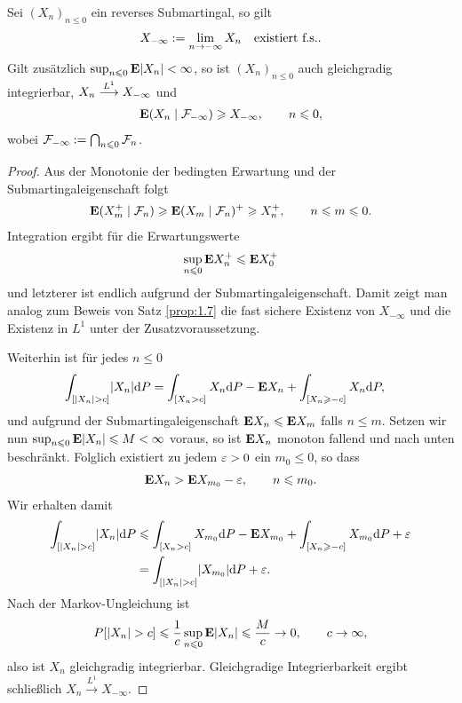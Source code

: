 \begin{prop}
\label{prop:1.8}
Sei $(X_n)_{n\le 0}$ ein reverses Submartingal, so gilt
\begin{align*}
X_{-\infty} := \lim\limits_{n\to-\infty} X_n\quad \text{existiert f.s.}.
\end{align*}
Gilt zusätzlich $\sup_{n\leqslant 0} \mathbf{E} \lvert X_n\rvert < \infty$, so ist $(X_n)_{n\le 0}$
auch gleichgradig integrierbar, $X_n\overset{L^1}{\longrightarrow}X_{-\infty}$ und
\begin{align*}
\mathbf{E}(X_n\mid \mathcal{F}_{-\infty}) \geqslant X_{-\infty},\qquad n\leqslant 0, 
\end{align*}
wobei $\mathcal{F}_{-\infty} := \bigcap_{n\leqslant 0}\mathcal{F}_n$.\fish
\end{prop}
\begin{proof}
Aus der Monotonie der bedingten Erwartung und der Submartingaleigenschaft folgt
\begin{align*}
\mathbf{E}(X_m^+\mid \mathcal{F}_n) \geqslant \mathbf{E}(X_m\mid \mathcal{F}_n)^+\geqslant X_n^+,\qquad n\leqslant m\leqslant 0.
\end{align*} 
Integration ergibt für die Erwartungswerte
\begin{align*}
\sup_{n\leqslant 0} \mathbf{E} X_n^+ \leqslant \mathbf{E} X_0^+ 
\end{align*}
und letzterer ist endlich aufgrund der Submartingaleigenschaft. Damit zeigt man
analog zum Beweis von Satz \ref{prop:1.7} die fast sichere Existenz von
$X_{-\infty}$ und die Existenz in $L^1$ unter der Zusatzvoraussetzung.

Weiterhin ist für jedes $n\le 0$
\begin{align*}
\int_{[\lvert X_n\rvert > c]} \lvert X_n\rvert\mathrm{d} P &= 
\int_{[X_n > c]} X_n\mathrm{d} P - \mathbf{E} X_n + 
\int_{[X_n \geqslant -c]} X_n\mathrm{d} P,
\end{align*}
und aufgrund der Submartingaleigenschaft $\mathbf{E} X_n \leqslant \mathbf{E} X_m$ falls $n\le m$.
Setzen wir nun $\sup_{n\leqslant 0} \mathbf{E} \lvert X_n\rvert \leqslant M < \infty$ voraus, so ist $\mathbf{E}
X_n$ monoton fallend und nach unten beschränkt. Folglich existiert zu jedem
$\varepsilon > 0$ ein $m_0\le 0$, so dass
\begin{align*}
\mathbf{E} X_n > \mathbf{E} X_{m_0} - \varepsilon,\qquad n\leqslant m_0.
\end{align*}
Wir erhalten damit
\begin{align*}
\int_{[\lvert X_n\rvert > c]} \lvert X_n\rvert\mathrm{d} P &\leqslant
\int_{[X_n > c]} X_{m_0}\mathrm{d} P - \mathbf{E} X_{m_0} + 
\int_{[X_n \geqslant -c]} X_{m_0}\mathrm{d} P +\varepsilon\\
& = \int_{[\lvert X_n\rvert > c]} \lvert X_{m_0}\rvert\mathrm{d} P + \varepsilon.
\end{align*}
Nach der Markov-Ungleichung ist
\begin{align*}
P[\lvert X_n\rvert > c ] \leqslant \frac{1}{c}\sup_{n\leqslant 0} \mathbf{E} \lvert X_n\rvert\leqslant \frac{M}{c}\to
0,\qquad c\to \infty,
\end{align*}
also ist $X_n$ gleichgradig integrierbar. Gleichgradige
Integrierbarkeit ergibt schließlich $X_n\overset{L^1}{\longrightarrow}
X_{-\infty}$.


\end{proof}
